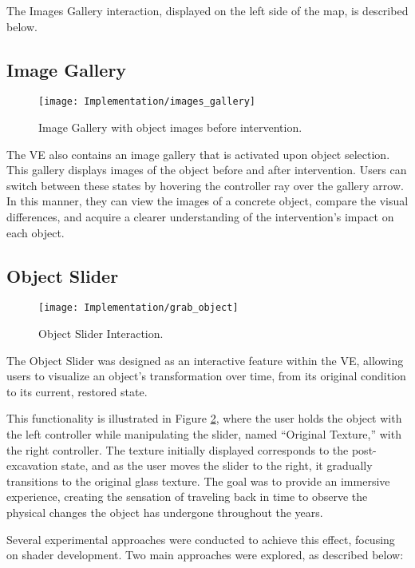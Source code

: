 The Images Gallery interaction, displayed on the left side of the map, is described below.

\subsection*{Image Gallery}
\label{sec:image_gallery}

\begin{figure}[h!]
    \centering
    \texttt{[image: Implementation/images\_gallery]}
    \caption{Image Gallery with object images before intervention.}
    \label{fig:image_gallery}
\end{figure}

The \gls{VE} also contains an image gallery that is activated upon object selection. 
This gallery displays images of the object before and after intervention. 
Users can switch between these states by hovering the controller ray over the gallery arrow. 
In this manner, they can view the images of a concrete object, compare the visual differences, and acquire a clearer understanding of the intervention's impact on each object.

\subsection*{Object Slider}
 \begin{figure}[h!]
    \centering
    \texttt{[image: Implementation/grab\_object]}
    \caption{Object Slider Interaction.}
    \label{fig:object_slider}
\end{figure}

The Object Slider was designed as an interactive feature within the \gls{VE}, allowing users to visualize an object's transformation over time, from its original condition to its current, restored state. 

This functionality is illustrated in Figure \ref{fig:object_slider}, where the user holds the object with the left controller while manipulating the slider, named “Original Texture,” with the right controller. 
The texture initially displayed corresponds to the post-excavation state, and as the user moves the slider to the right, it gradually transitions to the original glass texture.
The goal was to provide an immersive experience, creating the sensation of traveling back in time to observe the physical changes the object has undergone throughout the years.

Several experimental approaches were conducted to achieve this effect, focusing on shader development.
Two main approaches were explored, as described below:


